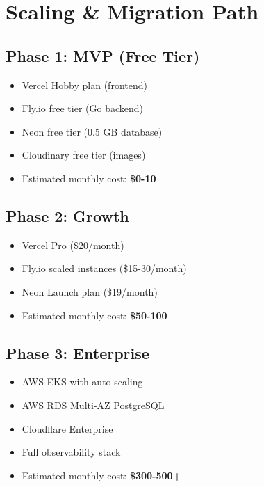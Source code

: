 \documentclass[11pt,a4paper]{article}
\begin{document}
\section{Scaling \& Migration Path}

\subsection{Phase 1: MVP (Free Tier)}
\begin{itemize}
    \item Vercel Hobby plan (frontend)
    \item Fly.io free tier (Go backend)
    \item Neon free tier (0.5 GB database)
    \item Cloudinary free tier (images)
    \item Estimated monthly cost: \textbf{\$0-10}
\end{itemize}

\subsection{Phase 2: Growth}
\begin{itemize}
    \item Vercel Pro (\$20/month)
    \item Fly.io scaled instances (\$15-30/month)
    \item Neon Launch plan (\$19/month)
    \item Estimated monthly cost: \textbf{\$50-100}
\end{itemize}

\subsection{Phase 3: Enterprise}
\begin{itemize}
    \item AWS EKS with auto-scaling
    \item AWS RDS Multi-AZ PostgreSQL
    \item Cloudflare Enterprise
    \item Full observability stack
    \item Estimated monthly cost: \textbf{\$300-500+}
\end{itemize}
\end{document}
